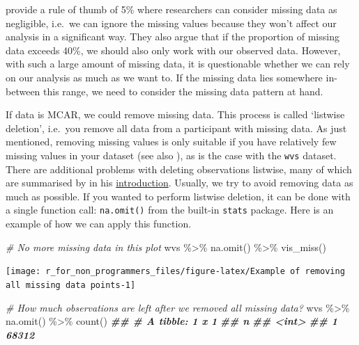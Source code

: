 \documentclass[
]{book}
\newenvironment{Shaded}{\begin{snugshade}}{\end{snugshade}}
\newcommand{\CommentTok}[1]{\textcolor[rgb]{0.56,0.35,0.01}{\textit{#1}}}
\newcommand{\DocumentationTok}[1]{\textcolor[rgb]{0.56,0.35,0.01}{\textbf{\textit{#1}}}}
\newcommand{\FunctionTok}[1]{\textcolor[rgb]{0.00,0.00,0.00}{#1}}
\newcommand{\NormalTok}[1]{#1}
\newcommand{\SpecialCharTok}[1]{\textcolor[rgb]{0.00,0.00,0.00}{#1}}
\begin{document}
\citet{jakobsen-et-al-2017} provide a rule of thumb of 5\% where researchers can consider missing data as negligible, i.e.~we can ignore the missing values because they won't affect our analysis in a significant way. They also argue that if the proportion of missing data exceeds 40\%, we should also only work with our observed data. However, with such a large amount of missing data, it is questionable whether we can rely on our analysis as much as we want to. If the missing data lies somewhere in-between this range, we need to consider the missing data pattern at hand.

If data is MCAR, we could remove missing data. This process is called `listwise deletion', i.e.~you remove all data from a participant with missing data. As just mentioned, removing missing values is only suitable if you have relatively few missing values in your dataset (see also \citet{schafer-1999}), as is the case with the \texttt{wvs} dataset. There are additional problems with deleting observations listwise, many of which are summarised by \citet{van-buuren-2018} in his \href{https://stefvanbuuren.name/fimd/sec-simplesolutions.html}{introduction}. Usually, we try to avoid removing data as much as possible. If you wanted to perform listwise deletion, it can be done with a single function call: \texttt{na.omit()} from the built-in \texttt{stats} package. Here is an example of how we can apply this function.

\begin{Shaded}
\begin{Highlighting}[]
\CommentTok{\# No more missing data in this plot}
\NormalTok{wvs }\SpecialCharTok{\%\textgreater{}\%} \FunctionTok{na.omit}\NormalTok{() }\SpecialCharTok{\%\textgreater{}\%} \FunctionTok{vis\_miss}\NormalTok{()}
\end{Highlighting}
\end{Shaded}

\begin{center}\texttt{[image: r\_for\_non\_programmers\_files/figure-latex/Example of removing all missing data points-1]} \end{center}

\begin{Shaded}
\begin{Highlighting}[]
\CommentTok{\# How much observations are left after we removed all missing data?}
\NormalTok{wvs }\SpecialCharTok{\%\textgreater{}\%} \FunctionTok{na.omit}\NormalTok{() }\SpecialCharTok{\%\textgreater{}\%} \FunctionTok{count}\NormalTok{()}
\DocumentationTok{\#\# \# A tibble: 1 x 1}
\DocumentationTok{\#\#       n}
\DocumentationTok{\#\#   \textless{}int\textgreater{}}
\DocumentationTok{\#\# 1 68312}
\end{Highlighting}
\end{Shaded}
\end{document}
